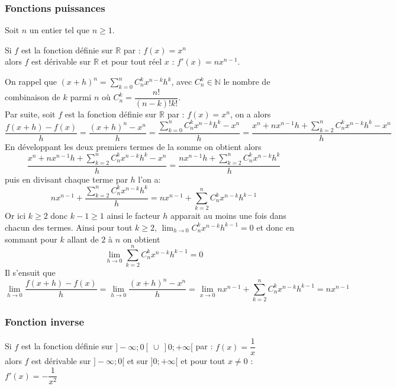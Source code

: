 \documentclass[french]{book}
\newcommand{\R}{\mathbb {R}}
\newcommand{\N}{\mathbb {N}}
\newcommand{\se}{\geq}
\newcommand{\ds}{\displaystyle}
\newcommand{\limo}[1][x]{\ds\lim_{#1\rightarrow 0}}
\begin{document}
\subsubsection*{Fonctions puissances}
\begin{prop}
Soit $n$ un entier tel que $n \se 1$.

Si $f$ est la fonction définie sur $\R$ par :  $f(x)=x^{n}$ \\
alors $f$ est dérivable sur $\R$ et pour tout réel $x$ :  $f'(x)=nx^{n-1}$.

\end{prop}

\begin{demo}
On rappel que $(x+h)^n=\sum^n_{k=0} C^k_n x^{n-k}h^k$, avec $ C^k_n \in \N$ le nombre de combinaison de $k$ parmi $n$ où $C^k_n=\dfrac{n!}{(n-k)!k!}$.\\

Par suite,  soit $f$ est la fonction définie sur $\R$ par :  $f(x)=x^{n}$, on a alors 
$$\dfrac{f(x+h)-f(x)}{h}=\dfrac{(x+h)^n -x^n }{h}=\dfrac{\sum^n_{k=0} C^k_n x^{n-k}h^k -x^n}{h}= \dfrac{x^n+nx^{n-1}h+\sum^n_{k=2} C^k_n x^{n-k}h^k -x^n}{h}$$
En développant les deux premiers termes de la somme on obtient alors
$$\dfrac{x^n+nx^{n-1}h+\sum^n_{k=2} C^k_n x^{n-k}h^k -x^n}{h}=\dfrac{nx^{n-1}h+\sum^n_{k=2} C^k_n x^{n-k}h^k}{h}$$
puis en divisant chaque terme par $h$ l'on a:
$$nx^{n-1}+ \dfrac{\sum^n_{k=2} C^k_n x^{n-k}h^k}{h}=nx^{n-1}+\sum^n_{k=2} C^k_n x^{n-k}h^{k-1}$$
Or ici $k\se2$ donc $k-1\se1$ ainsi le facteur $h$ apparait au moins une fois dans chacun des termes. Ainsi pour tout $k\se2$,  $\limo[h] C^k_n x^{n-k}h^{k-1} = 0$ et donc en sommant pour $k$ allant de $2$ à $n$ on obtient
$$\limo[h]  \sum^n_{k=2} C^k_n x^{n-k}h^{k-1}=0$$
Il s'ensuit que 
$$ \limo[h] \dfrac{f(x+h)-f(x)}{h}=\limo[h] \dfrac{(x+h)^n -x^n }{h}= \limo nx^{n-1}+\sum^n_{k=2} C^k_n x^{n-k}h^{k-1} = nx^{n-1} $$
\end{demo}

\subsubsection*{Fonction inverse}
\begin{prop}

Si $f$ est la fonction définie sur $]-\infty;0[~\cup~]0;+\infty[$ par :  $f(x)=\dfrac{1}{x}$ \\
alors $f$ est dérivable sur $]-\infty;0[$ et sur $]0;+\infty[$ et pour tout $x\neq 0$ :  $f'(x)=-\dfrac{1}{x^{2}}$

\end{prop}
\end{document}

